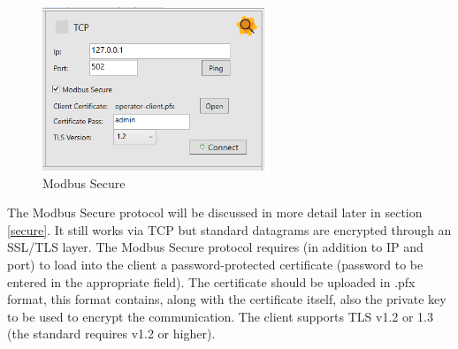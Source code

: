 \begin{figure}[H]
\centering
\includegraphics[width=0.6\textwidth]{../Img/ModBus_Home_Secure.PNG}
\caption[Modbus Secure]{Modbus Secure}
\end{figure}

The Modbus Secure protocol will be discussed in more detail later in section
\ref{secure}. It still works via TCP but standard datagrams are
encrypted through an SSL/TLS layer.
The Modbus Secure protocol requires (in addition to IP and port)
to load into the client
a password-protected certificate (password to be entered in the appropriate field).
The certificate should be uploaded in .pfx format, this
format contains, along with the certificate itself, also 
the private key to be used to encrypt the communication.
The client supports TLS v1.2 or 1.3 (the standard requires v1.2 or higher).
